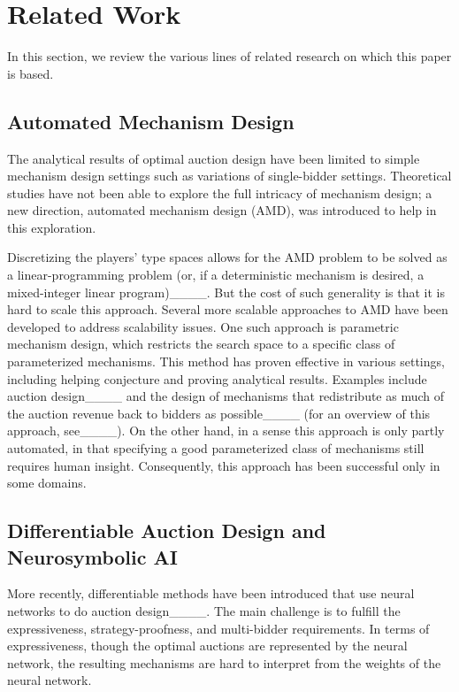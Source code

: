 \section{Related Work}
\label{sec:relatedwork}

In this section, we review the various lines of related research on which this paper is based.

\subsection{Automated Mechanism Design}
The analytical results of optimal auction design have been limited to simple mechanism design settings such as variations of single-bidder settings. Theoretical studies have not been able to explore the full intricacy of mechanism design; a new direction, automated mechanism design (AMD), was introduced to help in this exploration. 

Discretizing the players' type spaces allows for the AMD problem to be solved as a linear-programming problem (or, if a deterministic mechanism is desired, a mixed-integer linear program)____.
But the cost of such generality is that it is hard to scale this approach.
Several more scalable approaches to AMD have been developed to address scalability issues. One such approach is parametric mechanism design, which restricts the search space to a specific class of parameterized mechanisms. This method has proven effective in various settings, including helping conjecture and proving analytical results. Examples include auction design____ and the design of mechanisms that redistribute as much of the auction revenue back to bidders as possible____ (for an overview of this approach, see____).  
On the other hand, in a sense this approach is only partly automated, in that specifying a good parameterized class of mechanisms still requires human insight. Consequently, this approach has been successful only in some domains. 



\subsection{Differentiable Auction Design and Neurosymbolic AI} 
More recently, differentiable methods have been introduced that use neural networks to do auction design____. The main challenge is to fulfill the expressiveness, strategy-proofness, and multi-bidder requirements. In terms of expressiveness, though the optimal auctions are represented by the neural network, the resulting mechanisms are hard to interpret from the weights of the neural network.

